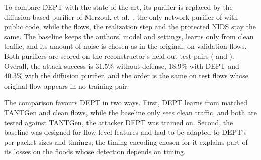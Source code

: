 To compare DEPT with the state of the art, its purifier is replaced by the diffusion-based
purifier of Merzouk et al.~\cite{merzouk2024diffusion}, the only network purifier of
 with public code, while the flows, the realization step and the
protected \ac{NIDS} stay the same. The baseline keeps the authors' model and settings,
learns only from clean traffic, and its amount of noise is chosen as in the original, on
validation flows. Both purifiers are scored on the reconstructor's held-out test pairs
( and ). Overall, the attack success is $31.5\%$
without defense, $18.9\%$ with DEPT and $40.3\%$ with the diffusion purifier, and the order
is the same on test flows whose original flow appears in no training pair.

The comparison favours DEPT in two ways. First, DEPT learns from matched TANTGen and
clean flows, while the baseline only sees clean traffic, and both are tested against
TANTGen, the attacker DEPT was trained on. Second, the baseline was designed for
flow-level features and had to be adapted to DEPT's per-packet sizes and timings; the
timing encoding chosen for it explains part of its losses on the floods whose detection
depends on timing.


